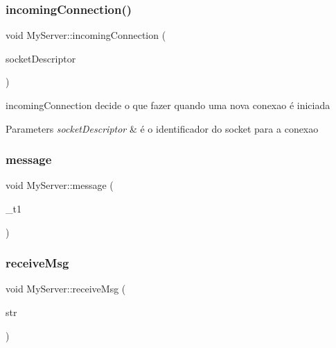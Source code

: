 \subsubsection{\texorpdfstring{incoming\+Connection()}{incomingConnection()}}
{\footnotesize\ttfamily void My\+Server\+::incoming\+Connection (\begin{DoxyParamCaption}\item[{qintptr}]{socket\+Descriptor }\end{DoxyParamCaption})\hspace{0.3cm}{\ttfamily [protected]}}



incoming\+Connection decide o que fazer quando uma nova conexao é iniciada 


\begin{DoxyParams}{Parameters}
{\em socket\+Descriptor} & é o identificador do socket para a conexao \\
\hline
\end{DoxyParams}
\mbox{\label{class_my_server_a2b884bce37840b1b461363a37b463b30}} 
\subsubsection{\texorpdfstring{message}{message}}
{\footnotesize\ttfamily void My\+Server\+::message (\begin{DoxyParamCaption}\item[{Q\+String}]{\+\_\+t1 }\end{DoxyParamCaption})\hspace{0.3cm}{\ttfamily [signal]}}

\mbox{\label{class_my_server_ac795ee6f1607c0fa4e635a0da2bf2164}} 
\subsubsection{\texorpdfstring{receive\+Msg}{receiveMsg}}
{\footnotesize\ttfamily void My\+Server\+::receive\+Msg (\begin{DoxyParamCaption}\item[{Q\+String}]{str }\end{DoxyParamCaption})\hspace{0.3cm}{\ttfamily [slot]}}

